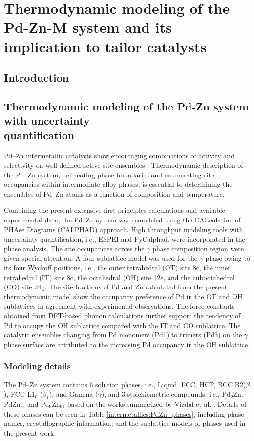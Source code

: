 \chapter{Thermodynamic modeling of the Pd-Zn-M system and its implication to tailor catalysts} \label{chap:intermetallics}

\section{Introduction} \label{intermetallics:sec:intro}

\section{Thermodynamic modeling of the Pd-Zn system with uncertainty \\quantification} \label{intermetallics:sec:PdZn}
Pd–Zn intermetallic catalysts show encouraging combinations of activity and selectivity on well-defined active site ensembles \cite{Dasgupta2022}. Thermodynamic description of the Pd–Zn system, delineating phase boundaries and enumerating site occupancies within intermediate alloy phases, is essential to determining the ensembles of Pd–Zn atoms as a function of composition and temperature. 

Combining the present extensive first-principles calculations and available experimental data, the Pd–Zn system was remodeled using the CALculation of PHAse Diagrams (CALPHAD) approach. High throughput modeling tools with uncertainty quantification, i.e., ESPEI and PyCalphad, were incorporated in the phase analysis. The site occupancies across the $\gamma$ phase composition region were given special attention. A four-sublattice model was used for the $\gamma$ phase owing to its four Wyckoff positions, i.e., the outer tetrahedral (OT) site 8c, the inner tetrahedral (IT) site 8c, the octahedral (OH) site 12e, and the cuboctahedral (CO) site 24g. The site fractions of Pd and Zn calculated from the present thermodynamic model show the occupancy preference of Pd in the OT and OH sublattices in agreement with experimental observations. The force constants obtained from DFT-based phonon calculations further support the tendency of Pd to occupy the OH sublattice compared with the IT and CO sublattice. The catalytic ensembles changing from Pd monomers (Pd1) to trimers (Pd3) on the $\gamma$ phase surface are attributed to the increasing Pd occupancy in the OH sublattice.

\subsection{Modeling details} \label{intermetallics:ssec:PdZnmodel}
The Pd–Zn system contains 6 solution phases, i.e., Liquid, FCC, HCP, BCC$\_$B2($\beta$), FCC$\_$L1$_0$ ($\beta_1$), and Gamma ($\gamma$), and 3 stoichiometric compounds, i.e., Pd$_2$Zn, PdZn$_2$, and Pd$_9$Zn$_{91}$ based on the works summarized by Vizdal et al. \cite{vizdal2006experimental}. Details of these phases can be seen in Table \ref{intermetallics:PdZn_phases}, including phase names, crystallographic information, and the sublattice models of phases used in the present work.

